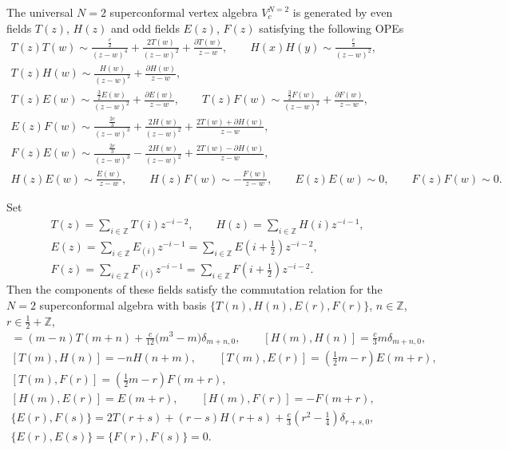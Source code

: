 \documentclass[11pt]{article}
\numberwithin{equation}{section}
\newcommand{\Z}{\mathbb Z}
\begin{document}
The universal $N=2$ superconformal vertex algebra $V^{N=2}_{c}$ is generated by even fields $T(z)$, $H(z)$ and odd fields $E(z)$, $F(z)$
satisfying the following OPEs
\begin{gather*}
 T(z)T(w) \sim \frac{\frac{c}{2}}{(z-w)^{4}}+\frac{2T(w)}{(z-w)^{2}} + \frac{\partial T(w)}{z-w}, \qquad H(x)H(y) \sim \frac{ \frac{c}{3}}{(z-w)^{2}}, \qquad \\
 T(z)H(w) \sim \frac{H(w)}{ (z-w)^{2}}+ \frac{\partial H(w)}{z-w}, \\
 T(z)E(w) \sim \frac{\frac{3}{2} E(w)}{(z-w)^{2}} + \frac{\partial E(w)}{z-w}, \qquad T(z)F(w) \sim \frac{\frac{3}{2} F(w)}{(z-w)^{2}} + \frac{\partial F(w)}{z-w}, \\
	E(z)F(w) \sim \frac{\frac{2c}{3}}{(z-w)^{3}}+\frac{2H(w)}{(z-w)^{2}} + \frac{2T(w) + \partial H(w)}{z-w}, \\
	F(z)E(w) \sim \frac{\frac{2c}{3}}{(z-w)^{3}}-\frac{2H(w)}{(z-w)^{2}} + \frac{2T(w) - \partial H(w)}{z-w}, \\
	H(z)E(w) \sim \frac{E(w)}{z-w}, \qquad H(z)F(w) \sim -\frac{F(w)}{z-w}, \qquad E(z)E(w) \sim 0, \qquad F(z)F(w) \sim 0. 	
\end{gather*}

Set
\begin{gather*}
 T(z) = \sum _{i \in {\Z}} T(i) z^{-i-2}, \qquad H(z) = \sum _{i \in {\Z}} H(i) z^{-i-1},\\
 E(z) = \sum _{i \in {\Z}} E_{(i)} z^{-i-1} = \sum _{i \in {\Z}} E\left(i+\frac{1}{2}\right)z^{-i-2},\\
 F(z) = \sum _{i \in {\Z}} F_{(i)} z^{-i-1} = \sum _{i \in {\Z}} F\left(i+\frac{1}{2}\right)z^{-i-2}.
 \end{gather*}
 Then the components of these fields satisfy the commutation relation for the $N=2$ superconformal algebra with basis $\{T(n), H(n), E(r), F(r)\}$, $n \in \mathbb{Z}$, $r \in \frac{1}{2}+\mathbb{Z}$,
\begin{gather*}
	[T(m), T(n)] = (m-n)T(m+n) + \frac{c}{12}\bigl(m^3 - m\bigr)\delta_{m+n,0}, \qquad [H(m), H(n)] = \frac{c}{3}m\delta_{m+n,0}, \\
	[T(m), H(n)] = -nH(n+m), \qquad [ T(m) , E(r) ] = \left(\frac{1}{2} m-r \right)E(m+r), \\
 [ T(m) , F(r) ] = \left(\frac{1}{2} m-r \right)F(m+r), \\
	[ H(m) ,E(r)] = E(m+r), \qquad [ H(m) , F(r)] = -F(m+r), \\
	\{E(r), F(s) \} = 2 T({r + s}) + ( r - s )H(r + s) + \frac{c}{3}\left( r^2 - \frac{1}{4} \right)\delta_{r+s,0}, \\
	\{E(r), E(s) \} = \{F(r), F(s) \} = 0.
\end{gather*}
\end{document}
